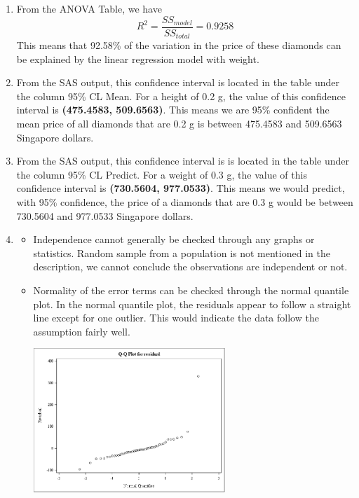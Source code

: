 \documentclass{article}
\begin{document}
\begin{enumerate}[leftmargin = 0 em, label = \arabic*., font = \bfseries]
\item 
From the ANOVA Table, we have 
\[R^2 = \frac{SS_{model}}{SS_{total}} = 0.9258\]
This means that 92.58\% of the variation in the price of these diamonds can be
explained by the linear regression model with weight.


\item 
From the SAS output, this confidence interval is located in the table under the column 95\%
CL Mean. For a height of 0.2 g, the value of this confidence interval is \textbf{(475.4583, 509.6563)}. 
This means we are 95\% confident the mean price of all diamonds that are 0.2 g is between 475.4583 and 509.6563 Singapore dollars.


\item 
From the SAS output, this confidence interval is is located in the table under the column 95\% CL Predict. For a weight of 0.3 g, the value
of this confidence interval is \textbf{(730.5604, 977.0533)}. This means we would predict, with 95\% confidence, the price of a diamonds that are 0.3 g would
be between 730.5604 and 977.0533 Singapore dollars. 


\item 
\begin{itemize}
	\item 
	Independence cannot generally be checked through any graphs or statistics. Random sample from a population is not mentioned in the description, we cannot
conclude the observations are independent or not.

\item
Normality of the error terms can be checked through the normal quantile plot. In the normal quantile plot, the residuals appear to follow a
straight line except for one outlier.  This would indicate the data follow the assumption fairly well.

\begin{center}
	\includegraphics[width = 0.6\textwidth]{qq.png}
\end{center}


\end{itemize}
\end{enumerate}
\end{document}
